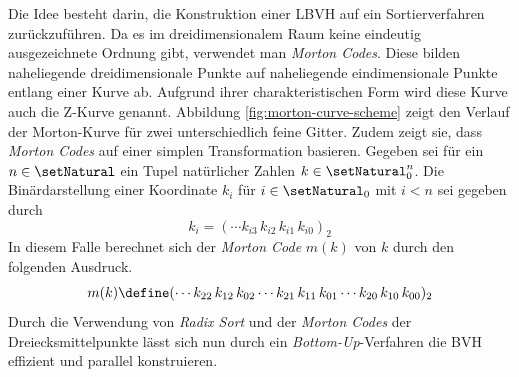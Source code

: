 \documentclass[crop=false]{standalone}
\begin{document}
      Die Idee besteht darin, die Konstruktion einer LBVH auf ein Sortierverfahren zurückzuführen.
      Da es im dreidimensionalem Raum keine eindeutig ausgezeichnete Ordnung gibt, verwendet man \textit{Morton Codes}.
      Diese bilden naheliegende dreidimensionale Punkte auf naheliegende eindimensionale Punkte entlang einer Kurve ab.
      Aufgrund ihrer charakteristischen Form wird diese Kurve auch die Z-Kurve genannt.
      Abbildung \ref{fig:morton-curve-scheme} zeigt den Verlauf der Morton-Kurve für zwei unterschiedlich feine Gitter.
      Zudem zeigt sie, dass \textit{Morton Codes} auf einer simplen Transformation basieren.
      Gegeben sei für ein $n\in\setNatural$ ein Tupel natürlicher Zahlen $k\in\setNatural_0^n$.
      Die Binärdarstellung einer Koordinate $k_i$ für $i\in\setNatural_0$ mit $i<n$ sei gegeben durch
      \[
        k_i = (\cdots k_{i3}\, k_{i2}\, k_{i1}\, k_{i0})_2
      \]
      In diesem Falle berechnet sich der \textit{Morton Code} $m(k)$ von $k$ durch den folgenden Ausdruck.
      \[
        m(k) \define (\cdots k_{22}\, k_{12}\, k_{02}\cdots k_{21}\, k_{11}\, k_{01}\cdots k_{20}\,k_{10}\,k_{00})_2
      \]
      Durch die Verwendung von \textit{Radix Sort} und der \textit{Morton Codes} der Dreiecksmittelpunkte lässt sich nun durch ein \textit{Bottom-Up}-Verfahren die BVH effizient und parallel konstruieren.
\end{document}
